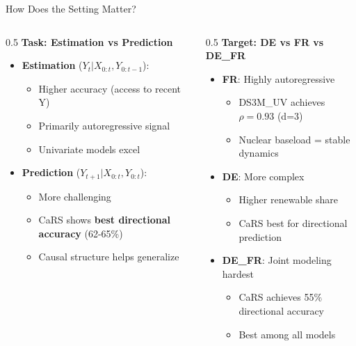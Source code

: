 \documentclass[aspectratio=169]{beamer}
\begin{document}
\begin{frame}{How Does the Setting Matter?}
\begin{columns}
\begin{column}{0.5\textwidth}
\textbf{Task: Estimation vs Prediction}
\begin{itemize}
    \item \textbf{Estimation} ($Y_t | X_{0:t}, Y_{0:t-1}$):
    \begin{itemize}
        \item Higher accuracy (access to recent Y)
        \item Primarily autoregressive signal
        \item Univariate models excel
    \end{itemize}
    \item \textbf{Prediction} ($Y_{t+1} | X_{0:t}, Y_{0:t}$):
    \begin{itemize}
        \item More challenging
        \item CaRS shows \textbf{best directional accuracy} (62-65\%)
        \item Causal structure helps generalize
    \end{itemize}
\end{itemize}
\end{column}

\begin{column}{0.5\textwidth}
\textbf{Target: DE vs FR vs DE\_FR}
\begin{itemize}
    \item \textbf{FR}: Highly autoregressive
    \begin{itemize}
        \item DS3M\_UV achieves $\rho = 0.93$ (d=3)
        \item Nuclear baseload = stable dynamics
    \end{itemize}
    \item \textbf{DE}: More complex
    \begin{itemize}
        \item Higher renewable share
        \item CaRS best for directional prediction
    \end{itemize}
    \item \textbf{DE\_FR}: Joint modeling hardest
    \begin{itemize}
        \item CaRS achieves 55\% directional accuracy
        \item Best among all models
    \end{itemize}
\end{itemize}
\end{column}
\end{columns}


\end{frame}
\end{document}
